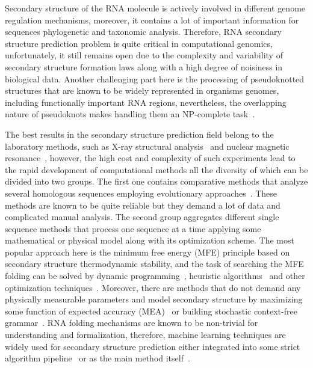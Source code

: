 Secondary structure of the RNA molecule is actively involved in different genome regulation mechanisms, moreover, it contains a lot of important information for sequences phylogenetic and taxonomic analysis. Therefore, RNA secondary structure prediction problem is quite critical in computational genomics, unfortunately, it still remains open due to the complexity and variability of secondary structure formation laws along with a high degree of noisiness in biological data. Another challenging part here is the processing of pseudoknotted structures that are known to be widely represented in organisms genomes, including functionally important RNA regions, nevertheless, the overlapping nature of pseudoknots makes handling them an NP-complete task~\cite{lyngso2000rna}. 

The best results in the secondary structure prediction field belong to the laboratory methods, such as X-ray structural analysis~\cite{westhof2015twenty} and nuclear magnetic resonance~\cite{furtig2003nmr}, however, the high cost and complexity of such experiments lead to the rapid development of computational methods all the diversity of which can be divided into two groups. The first one contains comparative methods that analyze several homologous sequences employing evolutionary approaches~\cite{hofacker1999automatic,tahi2002automatic}. These methods are known to be quite reliable but they demand a lot of data and complicated manual analysis. The second group aggregates different single sequence methods that process one sequence at a time applying some mathematical or physical model along with its optimization scheme. The most popular approach here is the minimum free energy (MFE) principle based on secondary structure thermodynamic stability, and the task of searching the MFE folding can be solved by dynamic programming~\cite{bellaousov2013rnastructure,rivas1999dynamic}, heuristic algorithms~\cite{ren2005hotknots,ruan2004ilm} and other optimization techniques~\cite{reeder2007pknotsrg,jabbari2018knotty}. Moreover, there are methods that do not demand any physically measurable parameters and model secondary structure by maximizing some function of expected accuracy (MEA)~\cite{sato2011ipknot,sato2009centroidfold} or building stochastic context-free grammar~\cite{knudsen1999rna,dowell2004evaluation,rivas1999dynamic}. RNA folding mechanisms are known to be non-trivial for understanding and formalization, therefore, machine learning techniques are widely used for secondary structure prediction either integrated into some strict algorithm pipeline~\cite{akiyama2018max,do2006contrafold} or as the main method itself~\cite{singh2019rna,apolloni2003rna}. 

